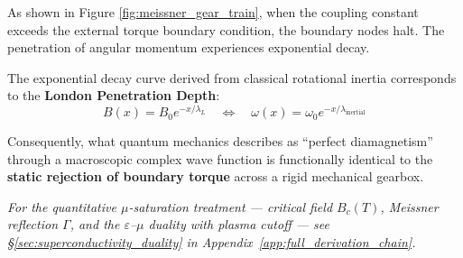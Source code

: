 As shown in Figure \ref{fig:meissner_gear_train}, when the coupling constant exceeds the external torque boundary condition, the boundary nodes halt. The penetration of angular momentum experiences exponential decay. 

The exponential decay curve derived from classical rotational inertia corresponds to the \textbf{London Penetration Depth}:
\begin{equation}
    B(x) = B_0 e^{-x/\lambda_L} \quad \Longleftrightarrow \quad \omega(x) = \omega_0 e^{-x/\lambda_{\text{inertial}}}
\end{equation}

Consequently, what quantum mechanics describes as ``perfect diamagnetism'' through a macroscopic complex wave function is functionally identical to the \textbf{static rejection of boundary torque} across a rigid mechanical gearbox.

\medskip\noindent
\textit{For the quantitative $\mu$-saturation treatment --- critical
field $B_c(T)$, Meissner reflection $\Gamma$, and the
$\varepsilon$--$\mu$ duality with plasma cutoff --- see
\S\ref{sec:superconductivity_duality} in
Appendix~\ref{app:full_derivation_chain}.}
